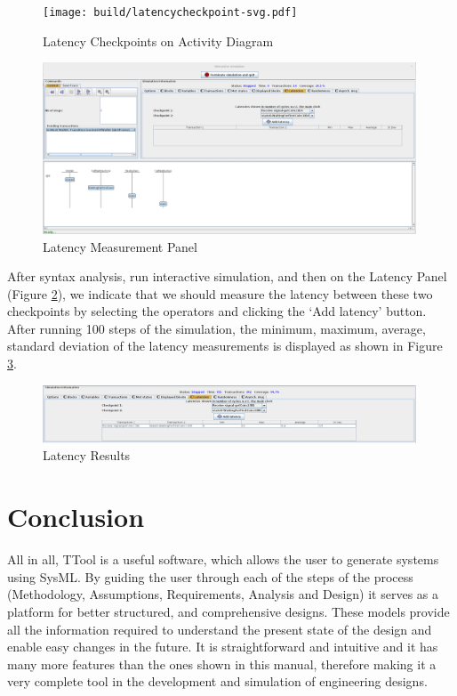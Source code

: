 \documentclass[12pt]{article}
\begin{document}
\begin{figure}[htbp]
\centering
\texttt{[image: build/latencycheckpoint-svg.pdf]}
\caption{Latency Checkpoints on Activity Diagram} \label{fig:latencycheckpoint}
\end{figure}


\begin{figure}[htbp]
\centering
\includegraphics[width=0.99\textwidth]{fig/latencymeasure.png}
\caption{Latency Measurement Panel} \label{fig:latencymeasurement}
\end{figure}

After syntax analysis, run interactive simulation, and then on the Latency Panel (Figure \ref{fig:latencymeasurement}), we indicate that we should measure the latency between these two checkpoints by selecting the operators and clicking the `Add latency' button. After running 100 steps of the simulation, the minimum, maximum, average, standard deviation of the latency measurements is displayed as shown in Figure \ref{fig:latencyresults}.

\begin{figure}[htbp]
\centering
\includegraphics[width=0.99\textwidth]{fig/latencyresults.png}
\caption{Latency Results} \label{fig:latencyresults}
\end{figure}


\section{Conclusion}

	All in all, TTool is a useful software, which allows the user to generate systems using SysML. By guiding the user through each of the steps of the process (Methodology, Assumptions, Requirements, Analysis and Design) it serves as a platform for better structured, and comprehensive designs. These models provide all the information required to understand the present state of the design and enable easy changes in the future. It is straightforward and intuitive and it has many more features than the ones shown in this manual, therefore making it a very complete tool in the development and simulation of engineering designs. 
	
\end{document}
